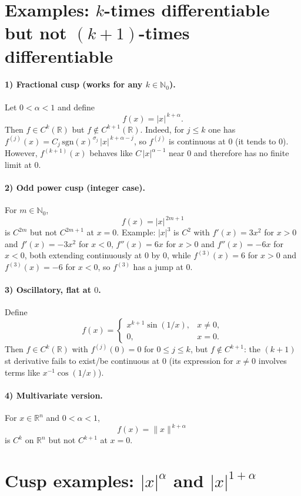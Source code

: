 \documentclass[12pt,a4paper]{article}
\begin{document}
\section*{Examples: $k$-times differentiable but not $(k{+}1)$-times differentiable}

\paragraph{1) Fractional cusp (works for any $k\in\mathbb{N}_0$).}
Let $0<\alpha<1$ and define
\[
f(x)=|x|^{\,k+\alpha}.
\]
Then $f\in C^{k}(\mathbb{R})$ but $f\notin C^{k+1}(\mathbb{R})$.
Indeed, for $j\le k$ one has $f^{(j)}(x)=C_{j}\,\mathrm{sgn}(x)^{\sigma_j}\,|x|^{\,k+\alpha-j}$,
so $f^{(j)}$ is continuous at $0$ (it tends to $0$). However, $f^{(k+1)}(x)$ behaves
like $C\,|x|^{\alpha-1}$ near $0$ and therefore has no finite limit at $0$.

\paragraph{2) Odd power cusp (integer case).}
For $m\in\mathbb{N}_0$,
\[
f(x)=|x|^{\,2m+1}
\]
is $C^{2m}$ but not $C^{2m+1}$ at $x=0$.
Example: $|x|^3$ is $C^2$ with
$f'(x)=3x^2$ for $x>0$ and $f'(x)=-3x^2$ for $x<0$,
$f''(x)=6x$ for $x>0$ and $f''(x)=-6x$ for $x<0$, both extending continuously at $0$ by $0$,
while $f^{(3)}(x)=6$ for $x>0$ and $f^{(3)}(x)=-6$ for $x<0$, so $f^{(3)}$ has a jump at $0$.

\paragraph{3) Oscillatory, flat at $0$.}
Define
\[
f(x)=
\begin{cases}
	x^{k+1}\sin(1/x), & x\neq 0,\\
	0, & x=0.
\end{cases}
\]
Then $f\in C^{k}(\mathbb{R})$ with $f^{(j)}(0)=0$ for $0\le j\le k$,
but $f\notin C^{k+1}$: the $(k{+}1)$st derivative fails to exist/be continuous at $0$
(its expression for $x\neq 0$ involves terms like $x^{-1}\cos(1/x)$).

\paragraph{4) Multivariate version.}
For $x\in\mathbb{R}^n$ and $0<\alpha<1$,
\[
f(x)=\|x\|^{\,k+\alpha}
\]
is $C^{k}$ on $\mathbb{R}^n$ but not $C^{k+1}$ at $x=0$.

\section*{Cusp examples: $|x|^\alpha$ and $|x|^{1+\alpha}$}
\end{document}
